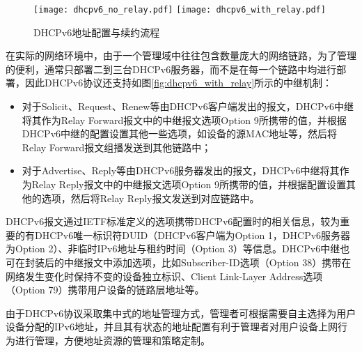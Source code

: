     \begin{figure}[ht]
      \centering
      {\texttt{[image: dhcpv6\_no\_relay.pdf]}}
      \hspace{2em}
      {\texttt{[image: dhcpv6\_with\_relay.pdf]}}
      \caption{DHCPv6地址配置与续约流程}
      \label{fig:dhcpv6_configure}
    \end{figure}

    在实际的网络环境中，由于一个管理域中往往包含数量庞大的网络链路，为了管理的便利，通常只部署二到三台DHCPv6服务器，而不是在每一个链路中均进行部署，因此DHCPv6协议还支持如图\ref{fig:dhcpv6_with_relay}所示的中继机制：
    
    \begin{itemize}
      \item 对于Solicit、Request、Renew等由DHCPv6客户端发出的报文，DHCPv6中继将其作为Relay Forward报文中的中继报文选项Option 9所携带的值，并根据DHCPv6中继的配置设置其他一些选项，如设备的源MAC地址等，然后将Relay Forward报文组播发送到其他链路中；
      \item 对于Advertise、Reply等由DHCPv6服务器发出的报文，DHCPv6中继将其作为Relay Reply报文中的中继报文选项Option 9所携带的值，并根据配置设置其他的选项，然后将Relay Reply报文发送到对应链路中。
    \end{itemize}

    DHCPv6报文通过IETF标准定义的选项携带DHCPv6配置时的相关信息，较为重要的有DHCPv6唯一标识符DUID（DHCPv6客户端为Option 1，DHCPv6服务器为Option 2）、非临时IPv6地址与租约时间（Option 3）等信息。DHCPv6中继也可在封装后的中继报文中添加选项，比如Subscriber-ID选项（Option 38）\cite{RFC4580}携带在网络发生变化时保持不变的设备独立标识、Client Link-Layer Address选项（Option 79）\cite{RFC6939}携带用户设备的链路层地址等。

    由于DHCPv6协议采取集中式的地址管理方式，管理者可根据需要自主选择为用户设备分配的IPv6地址，并且其有状态的地址配置有利于管理者对用户设备上网行为进行管理，方便地址资源的管理和策略定制。

